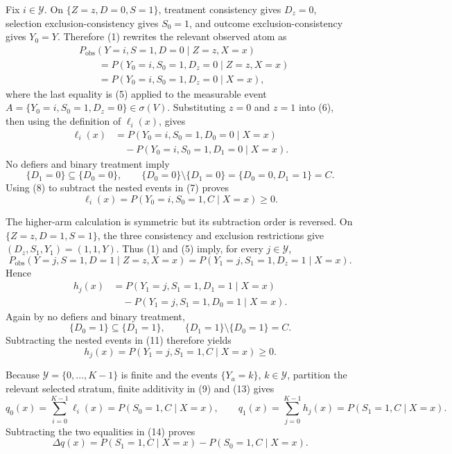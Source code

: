 Fix \(i\in\mathcal Y\).  On \(\{Z=z,D=0,S=1\}\), treatment consistency gives \(D_z=0\), selection exclusion-consistency gives \(S_0=1\), and outcome exclusion-consistency gives \(Y_0=Y\).  Therefore (1) rewrites the relevant observed atom as
\[
\begin{aligned}
&P_{\mathrm{obs}}(Y=i,S=1,D=0\mid Z=z,X=x)\\
&\qquad=P(Y_0=i,S_0=1,D_z=0\mid Z=z,X=x)\\
&\qquad=P(Y_0=i,S_0=1,D_z=0\mid X=x),
\end{aligned}
\tag{6}
\]
where the last equality is (5) applied to the measurable event \(A=\{Y_0=i,S_0=1,D_z=0\}\in\sigma(V)\).  Substituting \(z=0\) and \(z=1\) into (6), then using the definition of \(\ell_i(x)\), gives
\[
\begin{aligned}
\ell_i(x)
&=P(Y_0=i,S_0=1,D_0=0\mid X=x)\\
&\quad-P(Y_0=i,S_0=1,D_1=0\mid X=x).
\end{aligned}
\tag{7}
\]
No defiers and binary treatment imply
\[
\{D_1=0\}\subseteq\{D_0=0\},
\qquad
\{D_0=0\}\setminus\{D_1=0\}=\{D_0=0,D_1=1\}=C.
\tag{8}
\]
Using (8) to subtract the nested events in (7) proves
\[
\ell_i(x)=P(Y_0=i,S_0=1,C\mid X=x)\ge0.
\tag{9}
\]

The higher-arm calculation is symmetric but its subtraction order is reversed.  On \(\{Z=z,D=1,S=1\}\), the three consistency and exclusion restrictions give \((D_z,S_1,Y_1)=(1,1,Y)\).  Thus (1) and (5) imply, for every \(j\in\mathcal Y\),
\[
P_{\mathrm{obs}}(Y=j,S=1,D=1\mid Z=z,X=x)
=P(Y_1=j,S_1=1,D_z=1\mid X=x).
\tag{10}
\]
Hence
\[
\begin{aligned}
h_j(x)
&=P(Y_1=j,S_1=1,D_1=1\mid X=x)\\
&\quad-P(Y_1=j,S_1=1,D_0=1\mid X=x).
\end{aligned}
\tag{11}
\]
Again by no defiers and binary treatment,
\[
\{D_0=1\}\subseteq\{D_1=1\},
\qquad
\{D_1=1\}\setminus\{D_0=1\}=C.
\tag{12}
\]
Subtracting the nested events in (11) therefore yields
\[
h_j(x)=P(Y_1=j,S_1=1,C\mid X=x)\ge0.
\tag{13}
\]

Because \(\mathcal Y=\{0,\ldots,K-1\}\) is finite and the events \(\{Y_a=k\}\), \(k\in\mathcal Y\), partition the relevant selected stratum, finite additivity in (9) and (13) gives
\[
q_0(x)=\sum_{i=0}^{K-1}\ell_i(x)=P(S_0=1,C\mid X=x),
\qquad
q_1(x)=\sum_{j=0}^{K-1}h_j(x)=P(S_1=1,C\mid X=x).
\tag{14}
\]
Subtracting the two equalities in (14) proves
\[
\Delta q(x)
=P(S_1=1,C\mid X=x)-P(S_0=1,C\mid X=x).
\tag{15}
\]

